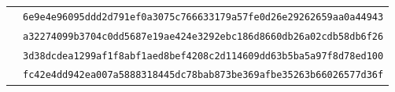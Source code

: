 {\begin{longtable}{L{0.36\textwidth}L{0.58\textwidth}}
 & \texttt{6e9e4e96095ddd2d791ef0a3075c7666}\allowbreak\texttt{33179a57fe0d26e29262659aa0a44943}\\
 & \texttt{a32274099b3704c0dd5687e19ae424e3}\allowbreak\texttt{292ebc186d8660db26a02cdb58db6f26}\\
 & \texttt{3d38dcdea1299af1f8abf1aed8bef420}\allowbreak\texttt{8c2d114609dd63b5ba5a97f8d78ed100}\\
 & \texttt{fc42e4dd942ea007a5888318445dc78b}\allowbreak\texttt{ab873be369afbe35263b66026577d36f}\\
\bottomrule\end{longtable}}
